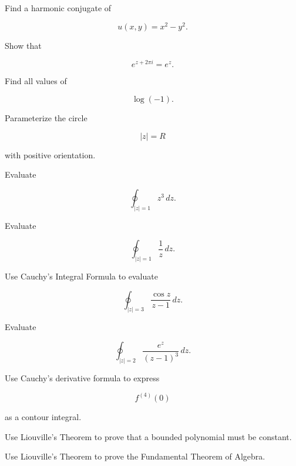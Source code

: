 \begin{exercise}[2]
Find a harmonic conjugate of

\[
u(x,y)=x^2-y^2.
\]
\end{exercise}

\begin{exercise}[2]
Show that

\[
e^{z+2\pi i}=e^z.
\]
\end{exercise}

\begin{exercise}[2]
Find all values of

\[
\log(-1).
\]
\end{exercise}

\begin{exercise}[2]
Parameterize the circle

\[
|z|=R
\]

with positive orientation.
\end{exercise}

\begin{exercise}[2]
Evaluate

\[
\oint_{|z|=1}z^3\,dz.
\]
\end{exercise}

\begin{exercise}[2]
Evaluate

\[
\oint_{|z|=1}\frac1z\,dz.
\]
\end{exercise}

\begin{exercise}[3]
Use Cauchy's Integral Formula to evaluate

\[
\oint_{|z|=3}
\frac{\cos z}{z-1}\,dz.
\]
\end{exercise}

\begin{exercise}[3]
Evaluate

\[
\oint_{|z|=2}
\frac{e^z}{(z-1)^3}\,dz.
\]
\end{exercise}

\begin{exercise}[3]
Use Cauchy's derivative formula to express

\[
f^{(4)}(0)
\]

as a contour integral.
\end{exercise}

\begin{exercise}[3]
Use Liouville's Theorem to prove that a bounded polynomial must be
constant.
\end{exercise}

\begin{exercise}[3]
Use Liouville's Theorem to prove the Fundamental Theorem of Algebra.
\end{exercise}

